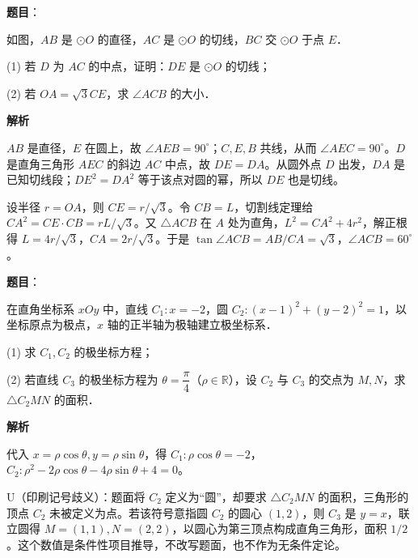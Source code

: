 \begin{answer}

\textbf{题目}：

如图，$AB$ 是 $\odot O$ 的直径，$AC$ 是 $\odot O$ 的切线，$BC$ 交 $\odot O$ 于点 $E$．
\nopagebreak[4]
\begin{center}\end{center}
\nopagebreak[4]
(1) 若 $D$ 为 $AC$ 的中点，证明：$DE$ 是 $\odot O$ 的切线；

(2) 若 $OA=\sqrt3 CE$，求 $\angle ACB$ 的大小．

\textbf{解析}


$AB$ 是直径，$E$ 在圆上，故 $\angle AEB=90^\circ$；$C,E,B$ 共线，从而 $\angle AEC=90^\circ$。$D$ 是直角三角形 $AEC$ 的斜边 $AC$ 中点，故 $DE=DA$。从圆外点 $D$ 出发，$DA$ 是已知切线段；$DE^2=DA^2$ 等于该点对圆的幂，所以 $DE$ 也是切线。


设半径 $r=OA$，则 $CE=r/\sqrt3$。令 $CB=L$，切割线定理给 $CA^2=CE\cdot CB=rL/\sqrt3$。又 $\triangle ACB$ 在 $A$ 处为直角，$L^2=CA^2+4r^2$，解正根得 $L=4r/\sqrt3$，$CA=2r/\sqrt3$。于是 $\tan\angle ACB=AB/CA=\sqrt3$，$\angle ACB=60^\circ$。



\end{answer}
\begin{answer}

\textbf{题目}：

在直角坐标系 $xOy$ 中，直线 $C_1:x=-2$，圆 $C_2:(x-1)^2+(y-2)^2=1$，以坐标原点为极点，$x$ 轴的正半轴为极轴建立极坐标系．

(1) 求 $C_1,C_2$ 的极坐标方程；

(2) 若直线 $C_3$ 的极坐标方程为 $\theta=\dfrac\pi4$（$\rho\in\mathbb R$），设 $C_2$ 与 $C_3$ 的交点为 $M,N$，求 $\triangle C_2MN$ 的面积．

\textbf{解析}


代入 $x=\rho\cos\theta,y=\rho\sin\theta$，得 $C_1:\rho\cos\theta=-2$，$C_2:\rho^2-2\rho\cos\theta-4\rho\sin\theta+4=0$。


U（印刷记号歧义）：题面将 $C_2$ 定义为“圆”，却要求 $\triangle C_2MN$ 的面积，三角形的顶点 $C_2$ 未被定义为点。若该符号意指圆 $C_2$ 的圆心 $(1,2)$，则 $C_3$ 是 $y=x$，联立圆得 $M=(1,1),N=(2,2)$，以圆心为第三顶点构成直角三角形，面积 $1/2$。这个数值是条件性项目推导，不改写题面，也不作为无条件定论。



\end{answer}
